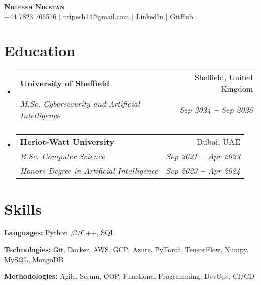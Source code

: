 \documentclass[letterpaper,11pt]{article}
\makeatletter
\newcommand{\resumeEducationHeading}[6]{
  \vspace{-2pt}\item
    \begin{tabular*}{0.97\textwidth}[t]{l@{\extracolsep{\fill}}r}
      \textbf{#1} & #2 \\
      \textit{\small#3} & \textit{\small #4} \\
      \textit{\small#5} & \textit{\small #6} \\
    \end{tabular*}\vspace{-5pt}
}
\newcommand{\resumeSubHeadingListStart}{\begin{itemize}[leftmargin=0.15in, label={}]}
\newcommand{\resumeSubHeadingListEnd}{\end{itemize}}
\makeatother
\begin{document}

\begin{center}
    \textbf{\Huge \scshape Nripesh Niketan} \\ \vspace{3pt}
    \small
    \faMobile \hspace{.5pt} \href{tel:+447823766576}{+44 7823 766576}
    $|$
    \faAt \hspace{.5pt} \href{mailto:nripesh14@gmail.com}{nripesh14@gmail.com}
    $|$
    \faLinkedinSquare \hspace{.5pt} \href{https://www.linkedin.com/in/nripeshn/}{LinkedIn}
    $|$
    \faGithub \hspace{.5pt} \href{https://github.com/NripeshN}{GitHub}
\end{center}




\section{Education}
  \vspace{3pt}
  \resumeSubHeadingListStart
    
    \resumeEducationHeading
      {University of Sheffield}{Sheffield, United Kingdom}
      {M.Sc. Cybersecurity and Artificial Intelligence}{Sep 2024 \textbf{--} Sep 2025}
      {}{}

    \resumeEducationHeading
      {Heriot-Watt University}{Dubai, UAE}
      {B.Sc. Computer Science}{Sep 2021 \textbf{--} Apr 2023}
      {Honors Degree in Artificial Intelligence}{Sep 2023 \textbf{--} Apr 2024}
    
  \resumeSubHeadingListEnd




\section{Skills}
  \vspace{2pt}
  \resumeSubHeadingListStart
    \small{\item{
        
        \textbf{Languages:}{ Python ,C/C++, SQL } \\ \vspace{3pt}
        
        \textbf{Technologies:}{ Git, Docker, AWS, GCP, Azure, PyTorch, TensorFlow, Numpy, MySQL, MongoDB } \\ \vspace{3pt}
        
        \textbf{Methodologies:}{ Agile, Scrum, OOP, Functional Programming, DevOps, CI/CD} \\ \vspace{3pt}
        
    }}
  \resumeSubHeadingListEnd
\end{document}
